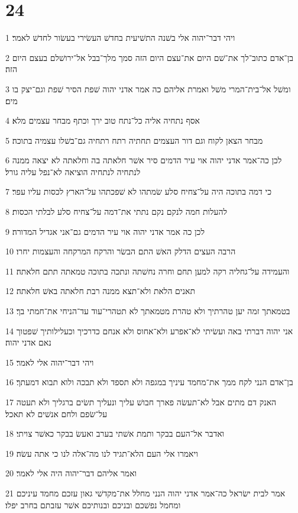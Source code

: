 \chapter{24}

\par 1 ויהי דבר־יהוה אלי בשׁנה התשׁיעית בחדשׁ העשׂירי בעשׂור לחדשׁ לאמר׃
\par 2 בן־אדם כתוב־לך את־שׁם היום את־עצם היום הזה סמך מלך־בבל אל־ירושׁלם בעצם היום הזה׃
\par 3 ומשׁל אל־בית־המרי משׁל ואמרת אליהם כה אמר אדני יהוה שׁפת הסיר שׁפת וגם־יצק בו מים׃
\par 4 אסף נתחיה אליה כל־נתח טוב ירך וכתף מבחר עצמים מלא׃
\par 5 מבחר הצאן לקוח וגם דור העצמים תחתיה רתח רתחיה גם־בשׁלו עצמיה בתוכה׃
\par 6 לכן כה־אמר אדני יהוה אוי עיר הדמים סיר אשׁר חלאתה בה וחלאתה לא יצאה ממנה לנתחיה לנתחיה הוציאה לא־נפל עליה גורל׃
\par 7 כי דמה בתוכה היה על־צחיח סלע שׂמתהו לא שׁפכתהו על־הארץ לכסות עליו עפר׃
\par 8 להעלות חמה לנקם נקם נתתי את־דמה על־צחיח סלע לבלתי הכסות׃
\par 9 לכן כה אמר אדני יהוה אוי עיר הדמים גם־אני אגדיל המדורה׃
\par 10 הרבה העצים הדלק האשׁ התם הבשׂר והרקח המרקחה והעצמות יחרו׃
\par 11 והעמידה על־גחליה רקה למען תחם וחרה נחשׁתה ונתכה בתוכה טמאתה תתם חלאתה׃
\par 12 תאנים הלאת ולא־תצא ממנה רבת חלאתה באשׁ חלאתה׃
\par 13 בטמאתך זמה יען טהרתיך ולא טהרת מטמאתך לא תטהרי־עוד עד־הניחי את־חמתי בך׃
\par 14 אני יהוה דברתי באה ועשׂיתי לא־אפרע ולא־אחוס ולא אנחם כדרכיך וכעלילותיך שׁפטוך נאם אדני יהוה׃
\par 15 ויהי דבר־יהוה אלי לאמר׃
\par 16 בן־אדם הנני לקח ממך את־מחמד עיניך במגפה ולא תספד ולא תבכה ולוא תבוא דמעתך׃
\par 17 האנק דם מתים אבל לא־תעשׂה פארך חבושׁ עליך ונעליך תשׂים ברגליך ולא תעטה על־שׂפם ולחם אנשׁים לא תאכל׃
\par 18 ואדבר אל־העם בבקר ותמת אשׁתי בערב ואעשׂ בבקר כאשׁר צויתי׃
\par 19 ויאמרו אלי העם הלא־תגיד לנו מה־אלה לנו כי אתה עשׂה׃
\par 20 ואמר אליהם דבר־יהוה היה אלי לאמר׃
\par 21 אמר לבית ישׂראל כה־אמר אדני יהוה הנני מחלל את־מקדשׁי גאון עזכם מחמד עיניכם ומחמל נפשׁכם ובניכם ובנותיכם אשׁר עזבתם בחרב יפלו׃
